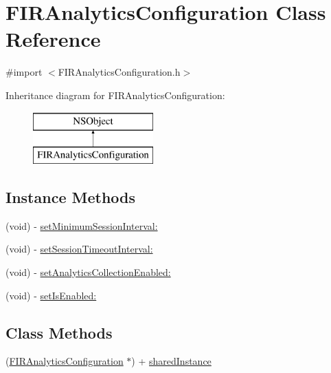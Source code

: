 \hypertarget{interface_f_i_r_analytics_configuration}{}\section{F\+I\+R\+Analytics\+Configuration Class Reference}
\label{interface_f_i_r_analytics_configuration}


{\ttfamily \#import $<$F\+I\+R\+Analytics\+Configuration.\+h$>$}

Inheritance diagram for F\+I\+R\+Analytics\+Configuration\+:\begin{figure}[H]
\begin{center}
\leavevmode
\includegraphics[height=2.000000cm]{interface_f_i_r_analytics_configuration}
\end{center}
\end{figure}
\subsection*{Instance Methods}
\begin{DoxyCompactItemize}
\item 
(void) -\/ \hyperlink{interface_f_i_r_analytics_configuration_a5c3d5801d596a25b4af6b9dd696918ab}{set\+Minimum\+Session\+Interval\+:}
\item 
(void) -\/ \hyperlink{interface_f_i_r_analytics_configuration_ab52dc6e74a096a8042abc52c02062deb}{set\+Session\+Timeout\+Interval\+:}
\item 
(void) -\/ \hyperlink{interface_f_i_r_analytics_configuration_a274f7ebe5becd0661b9d70ebc7f1b9d6}{set\+Analytics\+Collection\+Enabled\+:}
\item 
(void) -\/ \hyperlink{interface_f_i_r_analytics_configuration_a1f251a37056e4991f07afa6d7b281690}{set\+Is\+Enabled\+:}
\end{DoxyCompactItemize}
\subsection*{Class Methods}
\begin{DoxyCompactItemize}
\item 
(\hyperlink{interface_f_i_r_analytics_configuration}{F\+I\+R\+Analytics\+Configuration} $\ast$) + \hyperlink{interface_f_i_r_analytics_configuration_ae85d78fb93e01c84c376f9bec1655194}{shared\+Instance}
\end{DoxyCompactItemize}


